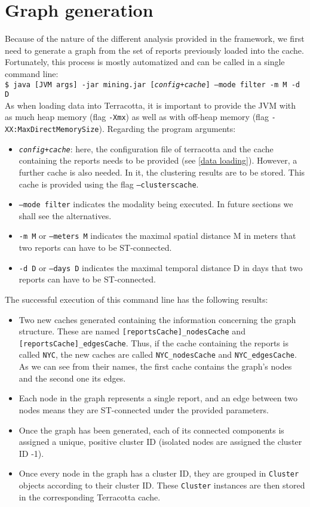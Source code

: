 \documentclass{article}
\begin{document}
	\section{Graph generation}
	\label{graph generation}
		Because of the nature of the different analysis provided in the framework, we first need to
		generate a graph from the set of reports previously loaded into the cache. Fortunately, this
		process is mostly automatized and can be called in a single command line:\\
		\texttt{\$ java [JVM args] -jar mining.jar [\emph{config+cache}] --mode filter -m M -d D}\\
		As when loading data into Terracotta, it is important to provide the JVM with as much heap 
		memory (flag \texttt{-Xmx}) as well as with off-heap memory (flag \texttt{-XX:MaxDirectMemorySize}).
		Regarding the program arguments:
		\begin{itemize}
			\item \texttt{\emph{config+cache}}: here, the configuration file of terracotta and the 
				cache containing the reports needs to be provided (see \ref{data loading}). However,
				a further cache is also needed. In it, the clustering results are to be stored.
				This cache is provided using the flag \texttt{--clusterscache}.
			\item \texttt{--mode filter} indicates the modality being executed. In future sections we shall see the alternatives.
			\item \texttt{-m M} or \texttt{--meters M} indicates the maximal spatial distance M in meters 
				that two reports can have to be ST-connected.
			\item \texttt{-d D} or \texttt{--days D} indicates the maximal temporal distance D in days
				that two reports can have to be ST-connected.
		\end{itemize}
		The successful execution of this command line has the following results:
		\begin{itemize}
			\item Two new caches generated containing the information concerning the graph structure. These are named
				\texttt{[reportsCache]\_nodesCache} and \texttt{[reportsCache]\_edgesCache}. Thus, if the
				cache containing the reports is called \texttt{NYC}, the new caches are called 
				\texttt{NYC\_nodesCache} and \texttt{NYC\_edgesCache}. As we can see from their names, 
				the first cache contains the graph's nodes and the second one its edges.
			\item Each node in the graph represents a single report, and an edge between two nodes 
				means they are ST-connected under the provided parameters.
			\item Once the graph has been generated, each of its connected components is assigned 
				a unique, positive cluster ID (isolated nodes are assigned the cluster ID -1).
			\item Once every node in the graph has a cluster ID, they are grouped in \texttt{Cluster}
				objects according to their cluster ID. These \texttt{Cluster} instances are then
				stored in the corresponding Terracotta cache.
		\end{itemize}
\end{document}
